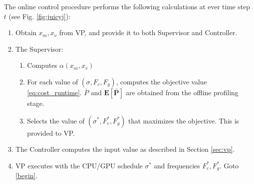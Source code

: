 %

The online control procedure performs the following calculations at ever time step $t$ (see Fig. \ref{fig:juicyj}):
\begin{enumerate}
	\item Obtain $x_m,x_v$ from VP, and provide it to both Supervisor and Controller.
	\label{begin}
	\item The Supervisor:
	\begin{enumerate}
		\item Computes $\alpha(x_m,x_v)$
		\item For each value of $(\sigma,F_c,F_g)$, computes the objective value \eqref{eq:cost_runtime}. $\bar{P}$ and $\mathbf{E[\bar{P}]}$ are obtained from the offline profiling stage.
		\item Selects the value of $(\sigma^*,F_c^*,F_g^*)$ that maximizes the objective. This is provided to VP.
	\end{enumerate}
	\item The Controller computes the input value as described in Section \ref{sec:vp}.
	\item VP executes with the CPU/GPU schedule $\sigma^*$ and frequencies $F_c^*,F_g^*$. Goto \ref{begin}.
\end{enumerate}







